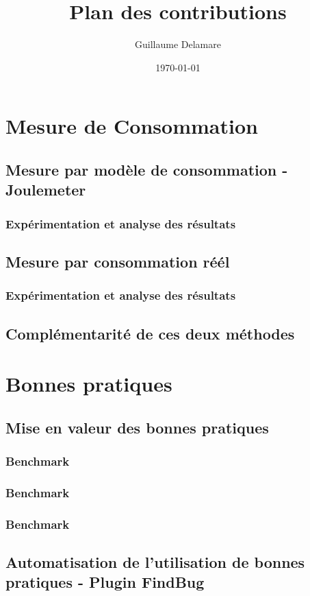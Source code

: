 \documentclass[a4paper, 11pt]{article}
\title{Plan des contributions}
\author{Guillaume Delamare}
\date{\today}
\begin{document}
    \maketitle
    \tableofcontents

    \section{Mesure de Consommation}
	\subsection{Mesure par modèle de consommation - Joulemeter}
	    \subsubsection{Expérimentation et analyse des résultats}
	\subsection{Mesure par consommation réél}
	    \subsubsection{Expérimentation et analyse des résultats}
	\subsection{Complémentarité de ces deux méthodes}

    \section{Bonnes pratiques}
	\subsection{Mise en valeur des bonnes pratiques}
	    \subsubsection{Benchmark}
	    \subsubsection{Benchmark}
	    \subsubsection{Benchmark}
	\subsection{Automatisation de l'utilisation de bonnes pratiques - Plugin FindBug}
\end{document}
